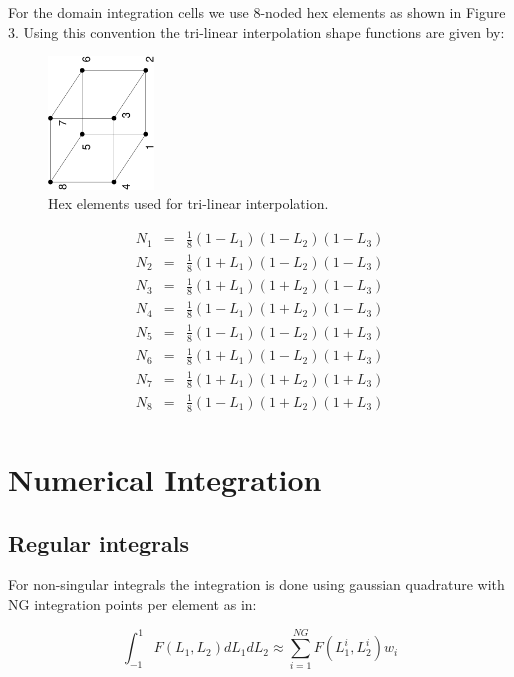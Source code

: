 \documentclass[12pt]{article}
\begin{document}
For the domain integration cells we use 8-noded hex elements as shown in Figure 3. Using this convention the tri-linear interpolation shape functions are given by:

\begin{figure}
\begin{center}
\includegraphics[width = 0.25\textwidth,angle=-90]{cell.pdf}
\caption{Hex elements used for tri-linear interpolation.}
\end{center}
\end{figure}

\begin{eqnarray}
N_1 & = & \frac{1}{8}(1-L_1)(1-L_2)(1-L_3)\\
N_2 & = & \frac{1}{8}(1+L_1)(1-L_2)(1-L_3)\\
N_3 & = & \frac{1}{8}(1+L_1)(1+L_2)(1-L_3)\\
N_4 & = & \frac{1}{8}(1-L_1)(1+L_2)(1-L_3)\\
N_5 & = & \frac{1}{8}(1-L_1)(1-L_2)(1+L_3)\\
N_6 & = & \frac{1}{8}(1+L_1)(1-L_2)(1+L_3)\\
N_7 & = & \frac{1}{8}(1+L_1)(1+L_2)(1+L_3)\\
N_8 & = & \frac{1}{8}(1-L_1)(1+L_2)(1+L_3)\\
\end{eqnarray}


\pagebreak
\section{Numerical Integration}

\subsection*{Regular integrals}
For non-singular integrals the integration is done using gaussian quadrature with NG integration points per element as in:

\begin{equation}
\int_{-1}^1{F(L_1,L_2)dL_1dL_2} \approx \sum_{i=1}^{NG}{F(L_1^i,L_2^i)w_i}
\end{equation}
\end{document}
